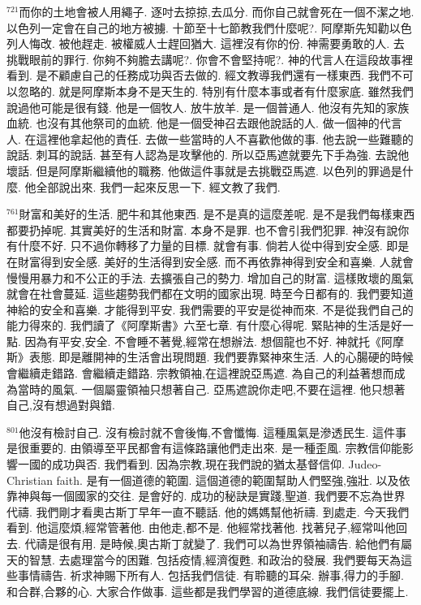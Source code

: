\documentclass{book}
\begin{document}
$^{721}$而你的土地會被人用繩子.
逐吋去掠掠,去瓜分.
而你自己就會死在一個不潔之地.
以色列一定會在自己的地方被擄.
十節至十七節教我們什麼呢?.
阿摩斯先知勸以色列人悔改.
被他趕走.
被權威人士趕回猶大.
這裡沒有你的份.
神需要勇敢的人.
去挑戰眼前的罪行.
你夠不夠膽去講呢?.
你會不會堅持呢?.
神的代言人在這段故事裡看到.
是不顧慮自己的任務成功與否去做的.
經文教導我們還有一樣東西.
我們不可以忽略的.
就是阿摩斯本身不是天生的.
特別有什麼本事或者有什麼家底.
雖然我們說過他可能是很有錢.
他是一個牧人.
放牛放羊.
是一個普通人.
他沒有先知的家族血統.
也沒有其他祭司的血統.
他是一個受神召去跟他說話的人.
做一個神的代言人.
在這裡他拿起他的責任.
去做一些當時的人不喜歡他做的事.
他去說一些難聽的說話.
刺耳的說話.
甚至有人認為是攻擊他的.
所以亞馬遮就要先下手為強.
去說他壞話.
但是阿摩斯繼續他的職務.
他做這件事就是去挑戰亞馬遮.
以色列的罪過是什麼.
他全部說出來.
我們一起來反思一下.
經文教了我們.

$^{761}$財富和美好的生活.
肥牛和其他東西.
是不是真的這麼差呢.
是不是我們每樣東西都要扔掉呢.
其實美好的生活和財富.
本身不是罪.
也不會引我們犯罪.
神沒有說你有什麼不好.
只不過你轉移了力量的目標.
就會有事.
倘若人從中得到安全感.
即是在財富得到安全感.
美好的生活得到安全感.
而不再依靠神得到安全和喜樂.
人就會慢慢用暴力和不公正的手法.
去擴張自己的勢力.
增加自己的財富.
這樣敗壞的風氣就會在社會蔓延.
這些趨勢我們都在文明的國家出現.
時至今日都有的.
我們要知道神給的安全和喜樂.
才能得到平安.
我們需要的平安是從神而來.
不是從我們自己的能力得來的.
我們讀了《阿摩斯書》六至七章.
有什麼心得呢.
緊貼神的生活是好一點.
因為有平安,安全.
不會睡不著覺,經常在想辦法.
想個龍也不好.
神就托《阿摩斯》表態.
即是離開神的生活會出現問題.
我們要靠緊神來生活.
人的心腸硬的時候會繼續走錯路.
會繼續走錯路.
宗教領袖,在這裡說亞馬遮.
為自己的利益著想而成為當時的風氣.
一個屬靈領袖只想著自己.
亞馬遮說你走吧,不要在這裡.
他只想著自己,沒有想過對與錯.

$^{801}$他沒有檢討自己.
沒有檢討就不會後悔,不會懺悔.
這種風氣是滲透民生.
這件事是很重要的.
由領導至平民都會有這條路讓他們走出來.
是一種歪風.
宗教信仰能影響一國的成功與否.
我們看到.
因為宗教,現在我們說的猶太基督信仰.
Judeo-Christian faith.
是有一個道德的範圍.
這個道德的範圍幫助人們堅強,強壯.
以及依靠神與每一個國家的交往.
是會好的.
成功的秘訣是實踐,聖道.
我們要不忘為世界代禱.
我們剛才看奧古斯丁早年一直不聽話.
他的媽媽幫他祈禱.
到處走.
今天我們看到.
他這麼煩,經常管著他.
由他走,都不是.
他經常找著他.
找著兒子,經常叫他回去.
代禱是很有用.
是時候,奧古斯丁就變了.
我們可以為世界領袖禱告.
給他們有屬天的智慧.
去處理當今的困難.
包括疫情,經濟復甦.
和政治的發展.
我們要每天為這些事情禱告.
祈求神賜下所有人.
包括我們信徒.
有聆聽的耳朵.
辦事,得力的手腳.
和合群,合夥的心.
大家合作做事.
這些都是我們學習的道德底線.
我們信徒要擺上.
\end{document}
